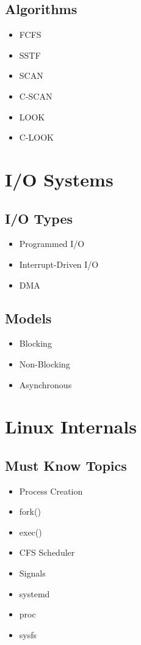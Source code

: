 \subsection*{Algorithms}

\begin{itemize}
\item FCFS
\item SSTF
\item SCAN
\item C-SCAN
\item LOOK
\item C-LOOK
\end{itemize}

\section{I/O Systems}

\subsection*{I/O Types}

\begin{itemize}
\item Programmed I/O
\item Interrupt-Driven I/O
\item DMA
\end{itemize}

\subsection*{Models}

\begin{itemize}
\item Blocking
\item Non-Blocking
\item Asynchronous
\end{itemize}

\section{Linux Internals}

\subsection*{Must Know Topics}

\begin{itemize}
\item Process Creation
\item fork()
\item exec()
\item CFS Scheduler
\item Signals
\item systemd
\item proc
\item sysfs
\end{itemize}

